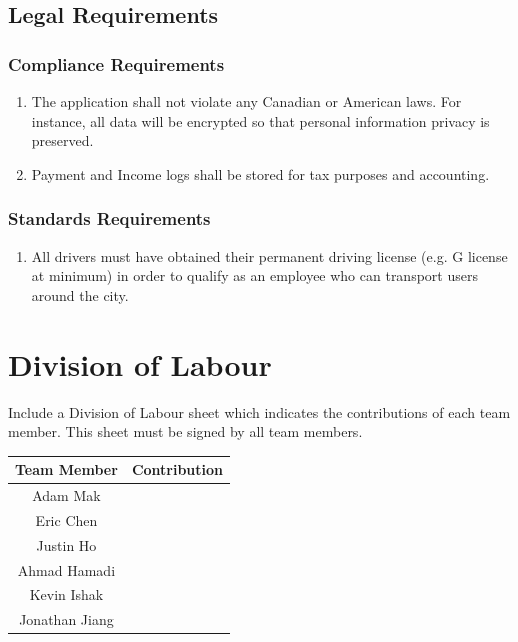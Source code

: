 \documentclass[]{article}
\begin{document}

\subsection{Legal Requirements}
\label{sub:legal_requirements}

\subsubsection{Compliance Requirements}
\label{ssub:compliance_requirements}
\begin{enumerate}[{LR-COMP}1. ]
	\item The application shall not violate any Canadian or American laws. For instance, all data will be encrypted so that personal information privacy is preserved.
	\item Payment and Income logs shall be stored for tax purposes and accounting.
\end{enumerate}

\subsubsection{Standards Requirements}
\label{ssub:standards_requirements}
\begin{enumerate}[{LR-STD}1. ]
	\item All drivers must have obtained their permanent driving license (e.g. G license at minimum) in order to qualify as an employee who can transport users around the city.
\end{enumerate}



\appendix
\section{Division of Labour}
\label{sec:division_of_labour}
Include a Division of Labour sheet which indicates the contributions of each team member. This sheet must be signed by all team members.
\begin{center} \begin{tabular} {|c|p{35em}|}
	\hline
	\textbf{Team Member} & \textbf{Contribution} \\
	\hline \hline
	Adam Mak &  \\
	\hline
	Eric Chen &  \\
	\hline
	Justin Ho &  \\
	\hline
	Ahmad Hamadi &  \\
	\hline
	Kevin Ishak &  \\
	\hline
	Jonathan Jiang &  \\
	\hline
\end{tabular} \end{center}
\end{document}

